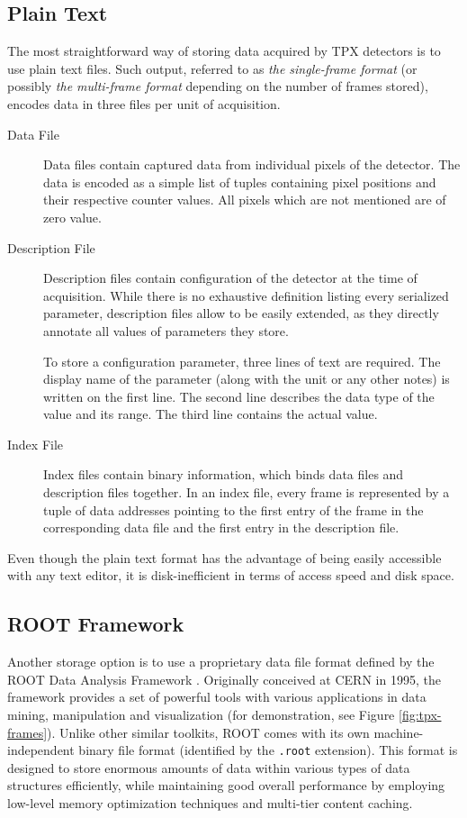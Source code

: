 \subsection{Plain Text}
The most straightforward way of storing data acquired by TPX detectors is to use plain text files. Such output, referred to as \textit{the single-frame format} (or possibly \textit{the multi-frame format} depending on the number of frames stored), encodes data in three files per unit of acquisition.

\begin{description}
	\item[Data File]
	Data files contain captured data from individual pixels of the detector. The data is encoded as a simple list of tuples containing pixel positions and their respective counter values. All pixels which are not mentioned are of zero value.

	\item[Description File]
	Description files contain configuration of the detector at the time of acquisition. While there is no exhaustive definition listing every serialized parameter, description files allow to be easily extended, as they directly annotate all values of parameters they store.

	To store a configuration parameter, three lines of text are required. The display name of the parameter (along with the unit or any other notes) is written on the first line. The second line describes the data type of the value and its range. The third line contains the actual value.

	\item[Index File]
	Index files contain binary information, which binds data files and description files together. In an index file, every frame is represented by a tuple of data addresses pointing to the first entry of the frame in the corresponding data file and the first entry in the description file.
\end{description}

Even though the plain text format has the advantage of being easily accessible with any text editor, it is disk-inefficient in terms of access speed and disk space.

\subsection{ROOT Framework}
\label{storage:ROOT}
Another storage option is to use a proprietary data file format defined by the ROOT Data Analysis Framework \cite{ROOT}. Originally conceived at CERN in 1995, the framework provides a set of powerful tools with various applications in data mining, manipulation and visualization (for demonstration, see Figure \ref{fig:tpx-frames}). Unlike other similar toolkits, ROOT comes with its own machine-independent binary file format (identified by the \texttt{.root} extension). This format is designed to store enormous amounts of data within various types of data structures efficiently, while maintaining good overall performance by employing low-level memory optimization techniques and multi-tier content caching.

